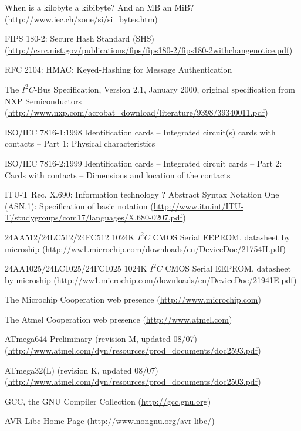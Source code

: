 \documentclass[10pt,a4paper]{article}
\begin{document}
\begin{thebibliography}{999}
 When is a kilobyte a kibibyte? And an MB an MiB? (\url{http://www.iec.ch/zone/si/si_bytes.htm})

 FIPS 180-2: Secure Hash Standard (SHS) (\url{http://csrc.nist.gov/publications/fips/fips180-2/fips180-2withchangenotice.pdf})
 
 RFC 2104: HMAC: Keyed-Hashing for Message Authentication

 The $I^2C$-Bus Specification, Version 2.1, January 2000, original specification from NXP Semiconductors (\url{http://www.nxp.com/acrobat_download/literature/9398/39340011.pdf})
 
 ISO/IEC 7816-1:1998 Identification cards -- Integrated circuit(s) cards with contacts -- Part 1: Physical characteristics

 ISO/IEC 7816-2:1999 Identification cards -- Integrated circuit cards -- Part 2: Cards with contacts -- Dimensions and location of the contacts

 ITU-T Rec. X.690: Information technology ? Abstract Syntax Notation One (ASN.1): Specification of basic notation (\url{http://www.itu.int/ITU-T/studygroups/com17/languages/X.680-0207.pdf})

  24AA512/24LC512/24FC512 1024K $I^2C$ CMOS Serial EEPROM, datasheet by microship (\url{http://ww1.microchip.com/downloads/en/DeviceDoc/21754H.pdf})

  24AA1025/24LC1025/24FC1025 1024K $I^2C$ CMOS Serial EEPROM, datasheet by microship (\url{http://ww1.microchip.com/downloads/en/DeviceDoc/21941E.pdf})

 The Microchip Cooperation web presence (\url{http://www.microchip.com})

 The Atmel Cooperation web presence (\url{http://www.atmel.com})  

 ATmega644 Preliminary (revision M, updated 08/07)  (\url{http://www.atmel.com/dyn/resources/prod_documents/doc2593.pdf})

 ATmega32(L) (revision K, updated 08/07)  (\url{http://www.atmel.com/dyn/resources/prod_documents/doc2503.pdf})

 GCC, the GNU Compiler Collection (\url{http://gcc.gnu.org})
 
 AVR Libc Home Page (\url{http://www.nongnu.org/avr-libc/})
\end{thebibliography}
\end{document}
